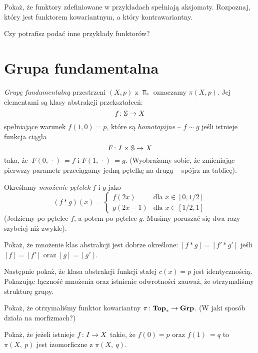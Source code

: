 \begin{problem}
  Pokaż, że funktory zdefiniowane w przykładach spełniają aksjomaty. Rozpoznaj, który jest funktorem kowariantnym, a który kontrawariantny.
\end{problem}

\begin{problem}
	Czy potrafisz podać inne przykłady funktorów?
\end{problem}

\section{Grupa fundamentalna}
\emph{Grupę  fundamentalną} przestrzeni $(X, p)$ z $\Top_*$ oznaczamy $\pi(X, p)$. Jej elementami są klasy abstrakcji przekształceń:
\[
	f\colon \mathbb S\to X
\]
spełniające warunek $f(1, 0) = p$, które są \emph{homotopijne} -- $f \sim g$ jeśli istnieje funkcja ciągła
\[
	F\colon I \times \mathbb{S}\to X
\]
taka, że $\ F(0,\ \cdot)\ = f$ i $F(1,\ \cdot)\ = g$.
(Wyobrażamy sobie, że zmieniając pierwszy parametr przeciągamy jedną pętelkę na drugą -- spójrz na tablicę).

Określamy \emph{mnożenie pętelek} $f$ i $g$ jako
\[
	(f*g)(x) = \begin{cases}
								f(2x) & \text{dla } x\in [0, 1/2]\\
								g(2x-1) & \text{dla } x\in [1/2, 1]
					 	\end{cases}
\]
(Jedziemy po pętelce $f$, a potem po pętelce $g$. Musimy poruszać się dwa razy szybciej niż zwykle).

\begin{problem}
	Pokaż, że mnożenie klas abstrakcji jest dobrze określone: $[f * g] = [f' * g']$ jeśli $[f]=[f']$ oraz $[g]=[g']$.

	Następnie pokaż, że klasa abstrakcji funkcji stałej $c(x)=p$ jest identycznością. Pokazując łączność mnożenia oraz istnienie odwrotności zauważ, że otrzymaliśmy strukturę grupy.
\end{problem}

\begin{problem}
	Pokaż, że otrzymaliśmy funktor kowariantny $\pi\colon \textbf{Top}_*\to \textbf{Grp}$. (W jaki sposób działa na morfizmach?)
\end{problem}

\begin{problem}
	Pokaż, że jeżeli istnieje $f\colon I\to X$ takie, że  $f(0)= p$ oraz $f(1)\ = q$ to $\pi(X,\ p)$ jest izomorficzne z $\pi(X,\ q)$.
\end{problem}

